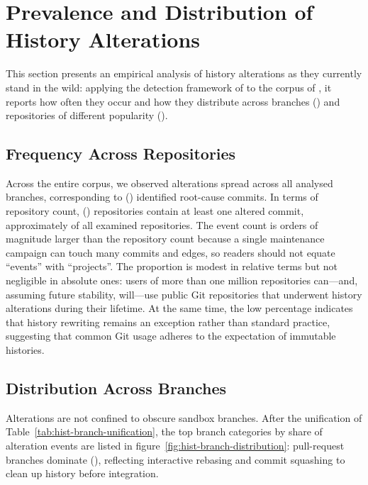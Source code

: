 \section{Prevalence and Distribution of History Alterations}
\label{sec:hist-prevalence}

This section presents an empirical analysis of history alterations as they currently stand in the wild: applying the detection framework of  to the corpus of , it reports how often they occur and how they distribute across branches () and repositories of different popularity ().

\subsection{Frequency Across Repositories}
\label{subsec:hist-freq}

Across the entire corpus, we observed \AlteredCommitsShort alterations spread across all analysed branches, corresponding to \GitRootCauseCommits (\GitRootCauseCommitsShort) identified root-cause commits.
In terms of repository count, \GitOriginsRootCauseCommits (\GitOriginsRootCauseCommitsShort) repositories contain at least one altered commit, approximately \PercentOriginsAltered of all examined repositories.
The event count is orders of magnitude larger than the repository count because a single maintenance campaign can touch many commits and edges, so readers should not equate ``events'' with ``projects''.
The proportion is modest in relative terms but not negligible in absolute ones: users of more than one million repositories can---and, assuming future stability, will---use public Git repositories that underwent history alterations during their lifetime.
At the same time, the low percentage indicates that history rewriting remains an exception rather than standard practice, suggesting that common Git usage adheres to the expectation of immutable histories.

\subsection{Distribution Across Branches}
\label{subsec:hist-dist-branches}

Alterations are not confined to obscure sandbox branches.
After the unification of Table~\ref{tab:hist-branch-unification}, the top branch categories by share of alteration events are listed in figure~\ref{fig:hist-branch-distribution}: pull-request branches dominate (\HistShareAlterationsPullBranch), reflecting interactive rebasing and commit squashing to clean up history before integration.

